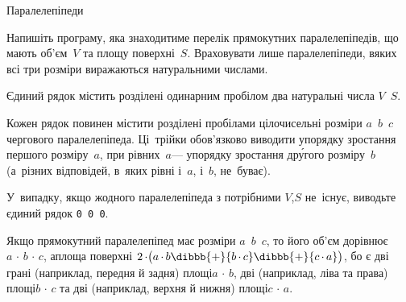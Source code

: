 \begin{problemAllDefault}{Паралелепіпеди}%


Напишіть програму, яка знаходитиме перелік прямокутних паралелепіпедів, що мають об'єм~$V$ та площу поверхні~$S$. Враховувати лише паралелепіпеди, в\nolinebreak[2] яких всі три розміри виражаються натуральними числами.

\InputFile
Єдиний рядок містить роз\-ді\-лені одинарним пробілом два натуральні числа $V$~$S$.

\OutputFile
Кожен рядок повинен містити розділені пробілами цілочисельні розміри $a$~$b$~$c$ чергового паралелепіпеда. Ці~трійки обов'язково виводити у\nolinebreak[3] порядку зростання першого розміру~$a$, при рівних~$a$\nolinebreak[3] --- у\nolinebreak[3] порядку зростання др\'{у}гого розміру~$b$\linebreak[3] (а~різних відповідей, в~яких рівні і~$a$, і~$b$, не~буває). 

У~випадку, якщо жодного паралелепіпеда з потрібними $V$,\nolinebreak[3] $S$ не~існує, виводьте єдиний рядок \texttt{0~0~0}.

\Notes
Якщо прямокутний паралелепіпед має розміри $a$~$b$~$c$, то його об'єм дорівнює\nolinebreak[3] ${a\,{\cdot}\,b\,{\cdot}\,c}$, а\nolinebreak[3] площа поверхні ${2\,{\cdot}\bigl(a\,{\cdot}\,b}\dibbb{{+}}{b\,{\cdot}\,c}\dibbb{{+}}{c\,{\cdot}\,a}\bigr)$, 
бо є 
дві \mbox{грані} (наприклад, передня й задня) площі\nolinebreak[2] ${a\,{\cdot}\,b}$, 
дві (наприклад, ліва та права) площі\nolinebreak[2] ${b\,{\cdot}\,c}$ 
та
дві (наприклад, верхня й нижня) площі\nolinebreak[2] ${c\,{\cdot}\,a}$.


\end{problemAllDefault}
